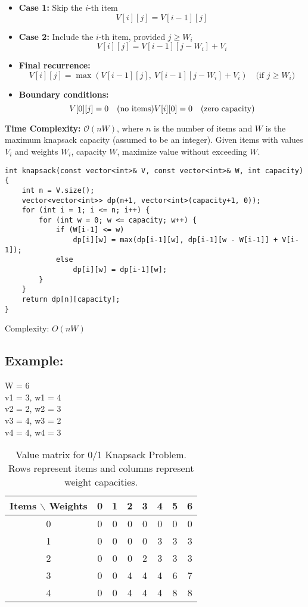 \documentclass{article}
\begin{document}
\begin{itemize}
    \item \textbf{Case 1:} Skip the $i$-th item
    \[
    V[i][j] = V[i-1][j]
    \]
    
    \item \textbf{Case 2:} Include the $i$-th item, provided $j \geq W_i$
    \[
    V[i][j] = V[i-1][j - W_i] + V_i
    \]
    
    \item \textbf{Final recurrence:}
    \[
    V[i][j] = \max(V[i-1][j],\ V[i-1][j - W_i] + V_i)
    \quad \text{(if } j \geq W_i\text{)}
    \]
    
    \item \textbf{Boundary conditions:}
    \[
    V[0][j] = 0 \quad \text{(no items)} \\
    V[i][0] = 0 \quad \text{(zero capacity)}
    \]
\end{itemize}

\textbf{Time Complexity:} $\mathcal{O}(nW)$, where $n$ is the number of items and $W$ is the maximum knapsack capacity (assumed to be an integer).
Given items with values \(V_i\) and weights \(W_i\), capacity \(W\), maximize value without exceeding \(W\).

\begin{lstlisting}[style=cppstyle]
int knapsack(const vector<int>& V, const vector<int>& W, int capacity) {
    int n = V.size();
    vector<vector<int>> dp(n+1, vector<int>(capacity+1, 0));
    for (int i = 1; i <= n; i++) {
        for (int w = 0; w <= capacity; w++) {
            if (W[i-1] <= w)
                dp[i][w] = max(dp[i-1][w], dp[i-1][w - W[i-1]] + V[i-1]);
            else
                dp[i][w] = dp[i-1][w];
        }
    }
    return dp[n][capacity];
}
\end{lstlisting}

Complexity: \(O(nW)\)

\subsection*{Example:}
W = 6 \\
v1 = 3, w1 = 4 \\
v2 = 2, w2 = 3 \\
v3 = 4, w3 = 2 \\
v4 = 4, w4 = 3 \\

\begin{table}[h!]
\centering
\begin{tabular}{c|ccccccc}
\textbf{Items} $\backslash$ \textbf{Weights} & 0 & 1 & 2 & 3 & 4 & 5 & 6 \\
\hline
0 & 0 & 0 & 0 & 0 & 0 & 0 & 0 \\
1 & 0 & 0 & 0 & 0 & 3 & 3 & 3 \\
2 & 0 & 0 & 0 & 2 & 3 & 3 & 3 \\
3 & 0 & 0 & 4 & 4 & 4 & 6 & 7 \\
4 & 0 & 0 & 4 & 4 & 4 & 8 & 8 \\
\end{tabular}
\caption{Value matrix for 0/1 Knapsack Problem. Rows represent items and columns represent weight capacities.}
\end{table}
\end{document}
